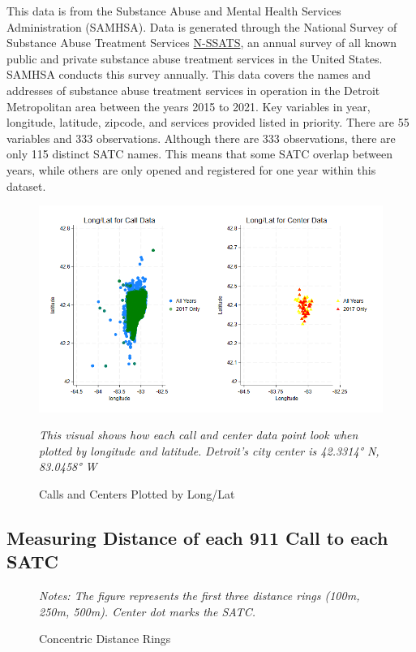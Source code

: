 \documentclass[12pt]{article}
\begin{document}
This data is from the Substance Abuse and Mental Health Services Administration (SAMHSA). Data is generated through the National Survey of Substance Abuse Treatment Services \href{https://www.samhsa.gov/data/data-we-collect/n-ssats-national-survey-substance-abuse-treatment-services}{N-SSATS}, an annual survey of all known public and private substance abuse treatment services in the United States. SAMHSA conducts this survey annually.  This data covers the names and addresses of substance abuse treatment services in operation in the Detroit Metropolitan area between the years 2015 to 2021. Key variables in year, longitude, latitude, zipcode, and services provided listed in priority. There are 55 variables and 333 observations. Although there are 333 observations, there are only 115 distinct SATC names. This means that some SATC overlap between years, while others are only opened and registered for one year within this dataset. 
\begin{figure}[htbp]
    \centering
\includegraphics[width=0.75\linewidth]{Reproducibility Package/Visual Graphics/Combined_Scatter.png}
    \caption{Calls and Centers Plotted by Long/Lat}
    \label{fig:Figure2}
     \textit{This visual shows how each call and center data point look when plotted by longitude and latitude.}
    \textit{Detroit's city center is 42.3314° N, 83.0458° W}
\end{figure}

\subsection{Measuring Distance of each 911 Call to each SATC}
 


\begin{figure} 
\caption{Concentric Distance Rings}
\small\textit{Notes: The figure represents the first three distance rings (100m, 250m, 500m). Center dot marks the SATC.}
\end{figure}
\end{document}

